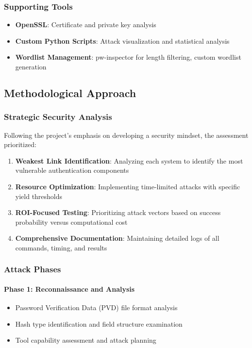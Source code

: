 \subsubsection{Supporting Tools}
\begin{itemize}
    \item \textbf{OpenSSL}: Certificate and private key analysis
    \item \textbf{Custom Python Scripts}: Attack visualization and statistical analysis
    \item \textbf{Wordlist Management}: pw-inspector for length filtering, custom wordlist generation
\end{itemize}

\subsection{Methodological Approach}

\subsubsection{Strategic Security Analysis}
Following the project's emphasis on developing a security mindset, the assessment prioritized:

\begin{enumerate}
    \item \textbf{Weakest Link Identification}: Analyzing each system to identify the most vulnerable authentication components
    \item \textbf{Resource Optimization}: Implementing time-limited attacks with specific yield thresholds
    \item \textbf{ROI-Focused Testing}: Prioritizing attack vectors based on success probability versus computational cost
    \item \textbf{Comprehensive Documentation}: Maintaining detailed logs of all commands, timing, and results
\end{enumerate}

\subsubsection{Attack Phases}

\paragraph{Phase 1: Reconnaissance and Analysis}
\begin{itemize}
    \item Password Verification Data (PVD) file format analysis
    \item Hash type identification and field structure examination
    \item Tool capability assessment and attack planning
\end{itemize}

